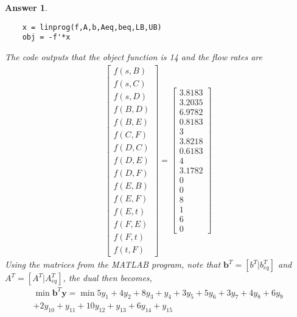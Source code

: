 \documentclass[12pt]{article}
\theoremstyle{colon}
\newtheorem*{answer}{Answer}
\begin{document}
\begin{answer}
\begin{verbatim}
    x = linprog(f,A,b,Aeq,beq,LB,UB)
    obj = -f'*x
  \end{verbatim}
  The code outputs that the object function is 14 and the flow rates are
  \begin{gather*}
    \begin{bmatrix}
          f(s,B) \\
          f(s,C) \\
          f(s,D) \\
          f(B,D) \\
          f(B,E) \\
          f(C,F) \\
          f(D,C) \\
          f(D,E) \\
          f(D,F) \\
          f(E,B) \\
          f(E,F) \\
          f(E,t) \\
          f(F,E) \\
          f(F,t) \\
          f(t,F)
    \end{bmatrix} = \begin{bmatrix}
      3.8183 \\
      3.2035 \\
      6.9782 \\
      0.8183 \\
      3 \\
      3.8218 \\
      0.6183 \\
      4 \\
      3.1782 \\
      0 \\
      0 \\
      8 \\
      1 \\
      6 \\
      0
    \end{bmatrix}
  \end{gather*}
  Using the matrices from the MATLAB program, note that $\textbf{b}^T = [b^T | b_{eq}^T]$ and $A^T = [A^T | A_{eq}^T]$, the dual then becomes,
  \begin{gather*}
    \min \textbf{b}^T \textbf{y} = \min 5y_1 + 4y_2 + 8y_3 + y_4 +3y_5 +5y_6 +3y_7 +4y_8 +6y_9 \\
                                        +2y_{10} +y_{11} +10y_{12} +y_{13} +6y_{14} +y_{15} \\

\end{gather*}
\end{answer}
\end{document}
